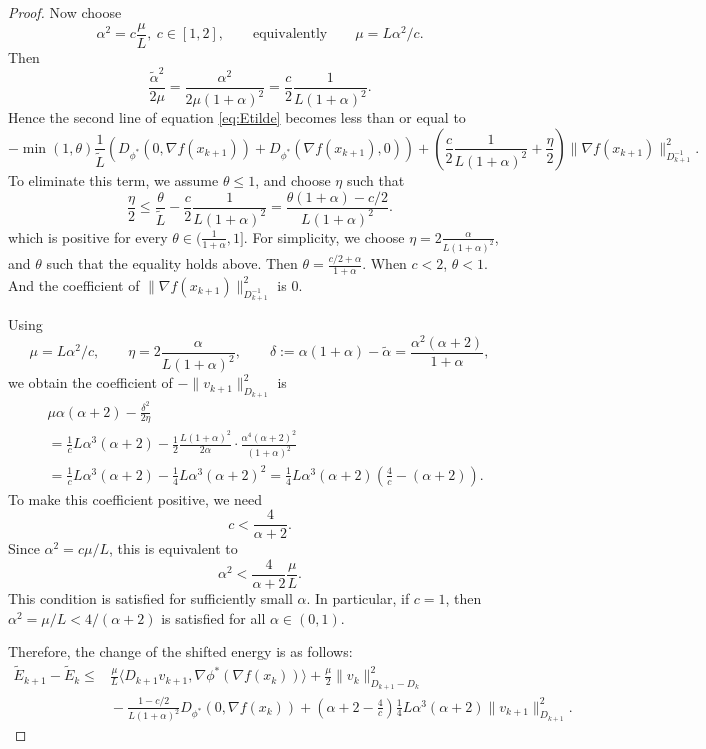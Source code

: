 \documentclass{article}
\theoremstyle{plain}
\theoremstyle{remark}
\begin{document}
\begin{proof}
Now choose
\[
\alpha^2 =  c\frac{\mu}{L},~c\in [1,2], \qquad\text{equivalently}\qquad \mu = L\alpha^2/c.
\]
Then
\[
\frac{\tilde{\alpha}^2}{2\mu} = \frac{\alpha^2}{2\mu(1+\alpha)^2} = \frac{c}{2}\frac{1}{L(1+\alpha)^2}.
\]
Hence the second line of equation \ref{eq:Etilde} becomes less than or equal to
\[
-\min(1,\theta)\frac{1}{\tilde{L}}\left(D_{\phi^*}(0,\nabla f(x_{k+1}))+D_{\phi^*}(\nabla f(x_{k+1}),0)\right) + \left(\frac{c}{2}\frac{1}{L(1+\alpha)^2}+\frac{\eta}{2}\right)\|\nabla f(x_{k+1})\|_{D_{k+1}^{-1}}^2.
\]
To eliminate this term, we assume $\theta\leq 1$, and choose $\eta$ such that
\[
\frac{\eta}{2} \leq \frac{\theta}{\tilde{L}} - \frac{c}{2}\frac{1}{L(1+\alpha)^2} = \frac{\theta(1+\alpha)-c/2}{L(1+\alpha)^2}.
\]
which is positive for every $\theta\in (\frac{1}{1+\alpha},1]$. For simplicity, we choose $\eta=2\frac{\alpha}{L(1+\alpha)^2}$, and $\theta$ such that the equality holds above. Then $\theta=\frac{c/2+\alpha}{1+\alpha}$. When $c<2$, $\theta<1$. And the coefficient of $\|\nabla f(x_{k+1})\|_{D_{k+1}^{-1}}^2$ is $0$. %

Using
\[
\mu = L\alpha^2/c, \qquad
\eta = 2\frac{\alpha}{L(1+\alpha)^2}, \qquad
\delta := \alpha(1+\alpha) - \tilde{\alpha} = \frac{\alpha^2(\alpha+2)}{1+\alpha},
\]
we obtain the coefficient of $-\|v_{k+1}\|_{D_{k+1}}^2$ is
\begin{align*}
&\mu\alpha(\alpha+2) - \frac{\delta^2}{2\eta}\\
&= \frac{1}{c}L\alpha^3(\alpha+2)
- \frac{1}{2}\frac{L(1+\alpha)^2}{2\alpha}\cdot\frac{\alpha^4(\alpha+2)^2}{(1+\alpha)^2}\\
&= \frac{1}{c}L\alpha^3(\alpha+2)- \frac{1}{4}L\alpha^3(\alpha+2)^2=\frac{1}{4}L\alpha^3(\alpha+2)\left(\frac{4}{c}-(\alpha+2)\right).
\end{align*}
To make this coefficient positive, we need
\[c<\frac{4}{\alpha+2}.\]
Since $\alpha^2 = c\mu/L$, this is equivalent to
\[\alpha^2 < \frac{4}{\alpha+2}\frac{\mu}{L}.\]
This condition is satisfied for sufficiently small $\alpha$. In particular, if $c=1$, then $\alpha^2 = \mu/L < 4/(\alpha+2)$ is satisfied for all $\alpha\in (0,1)$.


Therefore, the change of the shifted energy is as follows:
\[
\begin{aligned}
\widetilde{E}_{k+1} - \widetilde{E}_k
\le{}& \frac{\mu}{L}\langle D_{k+1}v_{k+1}, \nabla \phi^*(\nabla f(x_k))\rangle + \frac{\mu}{2}\|v_k\|_{D_{k+1}-D_k}^2\\
&{}- \frac{1-c/2}{L(1+\alpha)^2}D_{\phi^*}(0,\nabla f(x_{k}))+ \left( \alpha + 2 - \frac{4}{c} \right)\frac{1}{4}L\alpha^3(\alpha+2)\|v_{k+1}\|_{D_{k+1}}^2.
\end{aligned}
\]


\end{proof}
\end{document}
